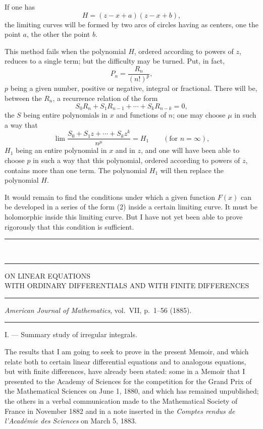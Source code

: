 \documentclass[11pt]{article}
\newcommand{\ornament}{\begin{center}\rule{2.5em}{0.4pt}\,\raisebox{0.1ex}{\tiny$\bullet\bullet\bullet$}\,\rule{2.5em}{0.4pt}\end{center}}
\newcommand{\shortline}{\begin{center}\rule{3.5em}{0.4pt}\end{center}}
\begin{document}
If one has
\[
H=(z-x+a)(z-x+b),
\]
the limiting curves will be formed by two arcs of circles having as centers, one the point $a$, the other the point $b$.

This method fails when the polynomial $H$, ordered according to powers of $z$, reduces to a single term; but the difficulty may be turned. Put, in fact,
\[
P_n=\frac{R_n}{(n!)^p},
\]
$p$ being a given number, positive or negative, integral or fractional. There will be, between the $R_n$, a recurrence relation of the form
\[
S_0R_n+S_1R_{n-1}+\cdots+S_kR_{n-k}=0,
\]
the $S$ being entire polynomials in $x$ and functions of $n$; one may choose $\mu$ in such a way that
\[
\lim \frac{S_0+S_1z+\cdots+S_kz^k}{n^\mu}=H_1 \qquad (\text{for } n=\infty),
\]
$H_1$ being an entire polynomial in $x$ and in $z$, and one will have been able to choose $p$ in such a way that this polynomial, ordered according to powers of $z$, contains more than one term. The polynomial $H_1$ will then replace the polynomial $H$.

It would remain to find the conditions under which a given function $F(x)$ can be developed in a series of the form (2) inside a certain limiting curve. It must be holomorphic inside this limiting curve. But I have not yet been able to prove rigorously that this condition is sufficient.

\ornament

\begin{center}
{\Large ON LINEAR EQUATIONS}\\[0.45em]
{\large WITH ORDINARY DIFFERENTIALS AND WITH FINITE DIFFERENCES}
\end{center}
\shortline
\begin{center}
\emph{American Journal of Mathematics}, vol.~VII, p.~1--56 (1885).
\end{center}
\shortline

\begin{center}
I. --- Summary study of irregular integrals.
\end{center}

The results that I am going to seek to prove in the present Memoir, and which relate both to certain linear differential equations and to analogous equations, but with finite differences, have already been stated: some in a Memoir that I presented to the Academy of Sciences for the competition for the Grand Prix of the Mathematical Sciences on June 1, 1880, and which has remained unpublished; the others in a verbal communication made to the Mathematical Society of France in November 1882 and in a note inserted in the \emph{Comptes rendus de l'Académie des Sciences} on March 5, 1883.
\end{document}
